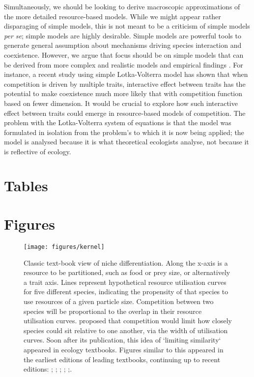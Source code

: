 \documentclass[a4paper,11pt]{article}
\begin{document}
Simultaneously, we should be looking to derive macroscopic
approximations of the more detailed resource-based models.  While we
might appear rather disparaging of simple models, this is not meant
to be a criticism of simple models \textit{per se}; simple models are
highly desirable.  Simple models are powerful tools to generate general assumption about mechanisms driving species interaction and coexistence. However, we argue that focus should be on simple models
that can be derived from more complex and realistic models and
empirical findings \citep[e.g.][]{Champagnat-2006}. For instance, a recent study \citep{Doebeli-2010} using simple Lotka-Volterra model has shown that when competition is driven by multiple traits, interactive effect between traits has the potential to make coexistence much more likely that with competition function based on fewer dimension. It would be crucial to explore how such interactive effect between traits could emerge in resource-based models of competition.
The problem with the Lotka-Volterra system of equations is that the
model was formulated in isolation from the problem's to which it is
now being applied; the model is analysed because it is what
theoretical ecologists analyse, not because it is reflective of
ecology.


\clearpage

\section{Tables}



\clearpage

\section{Figures}

\begin{figure}[h]
  \centering
  \texttt{[image: figures/kernel]}
  \caption{Classic text-book view of niche differentiation.  Along the
    x-axis is a resource to be partitioned, such as food or prey size,
    or alternatively a trait axis.  Lines represent hypothetical
    resource utilisation curves for five different species, indicating
    the propensity of that species to use resources of a given particle size.
    Competition between two species will be proportional to
    the overlap in their resource utilisation
    curves. \citet{MacArthur-1967} proposed that competition would
    limit how closely species could sit relative to one another, via
    the width of utilisation curves. Soon after its publication,
    this idea of `limiting similarity` appeared in ecology textbooks.
    Figures similar to this appeared in the earliest
    editions of leading textbooks, continuing up to recent editions:
    \citet[Fig. 7.9]{Begon-1986}; \citet[Fig. 8.29]{Begon-2006};
    \citet[Fig. 12.20]{Krebs-1978}; \citet[????]{ Krebs-2013};
    \citet[Fig. 36.13]{Ricklefs-1973};\citet[Fig. 29.19]{Ricklefs-1999}.}
  \label{fig:competition-kernels}
\end{figure}
\end{document}
